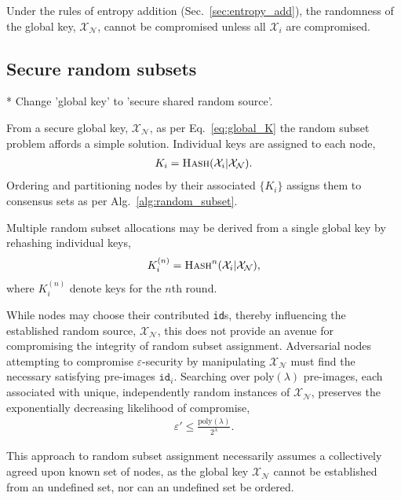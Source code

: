 \documentclass[twocolumn, aps, amsmath, amssymb, nofootinbib, superscriptaddress, longbibliography, floatfix, eqsecnum, rmp]{revtex4-2}
\begin{document}
Under the rules of entropy addition (Sec.~\ref{sec:entropy_add}), the randomness of the global key, $\mathcal{X}_\mathcal{N}$, cannot be compromised unless all $\mathcal{X}_i$ are compromised.

\subsection{Secure random subsets} \label{sec:hash_based_random_subsets}

* Change 'global key' to 'secure shared random source'.

From a secure global key, $\mathcal{X}_\mathcal{N}$, as per Eq.~\eqref{eq:global_K} the random subset problem affords a simple solution. Individual keys are assigned to each node,
\begin{align}
	K_i = \textsc{Hash}(\mathcal{X}_i|\mathcal{X}_\mathcal{N}).
\end{align}
Ordering and partitioning nodes by their associated $\{K_i\}$ assigns them to consensus sets as per Alg.~\ref{alg:random_subset}.

Multiple random subset allocations may be derived from a single global key by rehashing individual keys,
\begin{align}
		K_i^{(n)} = \textsc{Hash}^n(\mathcal{X}_i|\mathcal{X}_\mathcal{N}),
\end{align}
where $K_i^{(n)}$ denote keys for the $n$th round.

While nodes may choose their contributed \texttt{id}s, thereby influencing the established random source, $\mathcal{X}_\mathcal{N}$, this does not provide an avenue for compromising the integrity of random subset assignment. Adversarial nodes attempting to compromise $\varepsilon$-security by manipulating $\mathcal{X}_\mathcal{N}$ must find the necessary satisfying pre-images $\mathtt{id}_i$. Searching over $\mathrm{poly}(\lambda)$ pre-images, each associated with unique, independently random instances of $\mathcal{X}_\mathcal{N}$, preserves the exponentially decreasing likelihood of compromise,
\begin{align}
	\varepsilon' \leq \frac{\mathrm{poly}(\lambda)}{2^\lambda}.
\end{align}

This approach to random subset assignment necessarily assumes a collectively agreed upon known set of nodes, as the global key $\mathcal{X}_\mathcal{N}$ cannot be established from an undefined set, nor can an undefined set be ordered.

%
%
%
\end{document}
